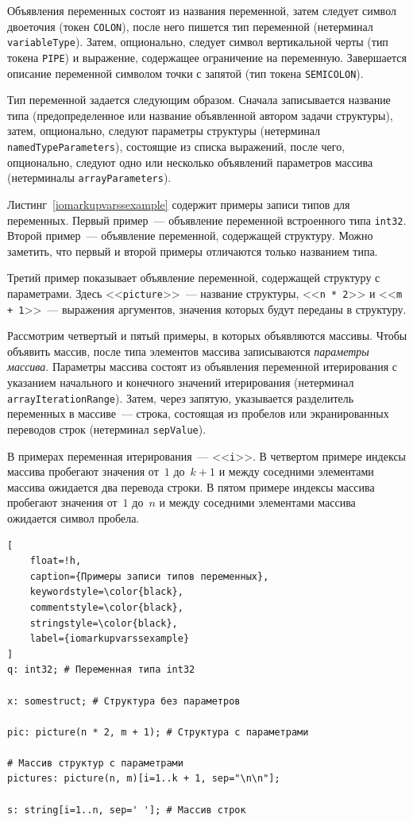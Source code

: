 \documentclass[times,specification,annotation]{style/itmo-student-thesis/itmo-student-thesis}
\begin{document}
Объявления переменных состоят из названия переменной, затем следует символ двоеточия (токен \texttt{COLON}), после него пишется тип переменной (нетерминал \texttt{variableType}). Затем, опционально, следует символ вертикальной черты (тип токена \texttt{PIPE}) и выражение, содержащее ограничение на переменную. Завершается описание переменной символом точки с запятой (тип токена \texttt{SEMICOLON}).

Тип переменной задается следующим образом. Сначала записывается название типа (предопределенное или название объявленной автором задачи структуры), затем, опционально, следуют параметры структуры (нетерминал \texttt{namedTypeParameters}), состоящие из списка выражений, после чего, опционально, следуют одно или несколько объявлений параметров массива (нетерминалы \texttt{arrayParameters}).

Листинг~\ref{iomarkupvarssexample} содержит примеры записи типов для переменных. Первый пример~--- объявление переменной встроенного типа \texttt{int32}. Второй пример~--- объявление переменной, содержащей структуру. Можно заметить, что первый и второй примеры отличаются только названием типа.

Третий пример показывает объявление переменной, содержащей структуру с параметрами. Здесь <<\texttt{picture}>>~--- название структуры, <<\texttt{n * 2}>> и <<\texttt{m + 1}>>~--- выражения аргументов, значения которых будут переданы в структуру.

Рассмотрим четвертый и пятый примеры, в которых объявляются массивы. Чтобы объявить массив, после типа элементов массива записываются \textit{параметры массива}. Параметры массива состоят из объявления переменной итерирования с указанием начального и конечного значений итерирования (нетерминал \texttt{arrayIterationRange}). Затем, через запятую, указывается разделитель переменных в массиве~--- строка, состоящая из пробелов или экранированных переводов строк (нетерминал \texttt{sepValue}).

В примерах переменная итерирования~--- <<\texttt{i}>>. В четвертом примере индексы массива пробегают значения от~$1$ до~$k + 1$ и между соседними элементами массива ожидается два перевода строки. В пятом примере индексы массива пробегают значения от~$1$ до~$n$ и между соседними элементами массива ожидается символ пробела.

\begin{lstlisting}[
    float=!h,
    caption={Примеры записи типов переменных},
    keywordstyle=\color{black},
    commentstyle=\color{black},
    stringstyle=\color{black},
    label={iomarkupvarssexample}
]
q: int32; # Переменная типа int32

x: somestruct; # Структура без параметров

pic: picture(n * 2, m + 1); # Структура с параметрами

# Массив структур с параметрами
pictures: picture(n, m)[i=1..k + 1, sep="\n\n"]; 

s: string[i=1..n, sep=' ']; # Массив строк
\end{lstlisting}
\end{document}
